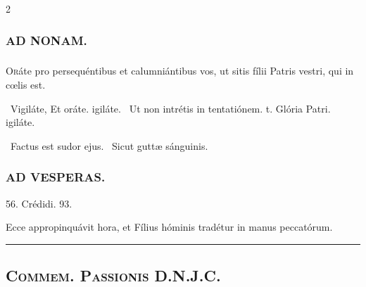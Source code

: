 \documentclass[9pt,twoside]{extarticle}
\begin{document}
\begin{multicols}{2}
\subsubsection*{\center \textsc{AD NONAM.}}
\subsubsection*{}
\lettrine{O}ráte pro persequéntibus et calumniántibus vos, ut sitis fílii Patris vestri, qui in cœlis est.

\begin{tightlist}{}
\item {}~Vigiláte, \textred{*} Et oráte. igiláte. ~Ut non intrétis in tentatiónem. t. Glória Patri. igiláte.
\item {}~Factus est sudor ejus. ~Sicut guttæ sánguinis.
\end{tightlist}

\subsubsection*{\center \textsc{AD VESPERAS.}}
\begin{tightlist}{}
\item {} 56.  Crédidi. 93.
\item {}
\item {} Ecce appropinquávit hora, et Fílius hóminis tradétur in manus peccatórum.
\item {}
\end{tightlist}

\begin{center}\textcolor{red}{\rule{\linewidth}{0.5pt}} \end{center}
\subsection*{\center {}}
\subsection*{\center \textsc{Commem. Passionis D.N.J.C.}}\\
\subsubsection*{\center {}}


\end{multicols}
\end{document}
